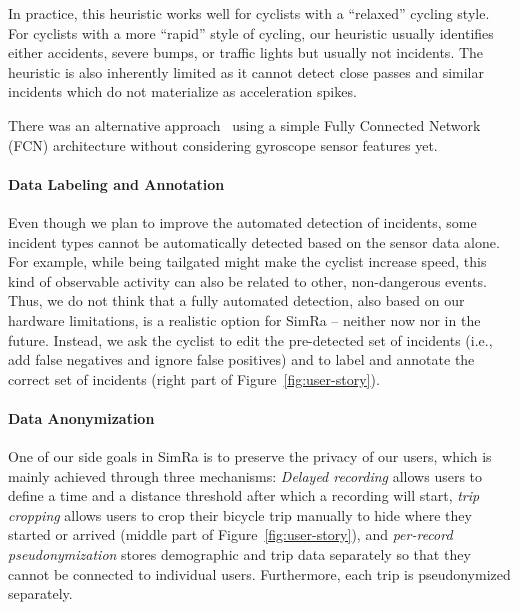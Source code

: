 In practice, this heuristic works well for cyclists with a ``relaxed'' cycling style.
For cyclists with a more ``rapid'' style of cycling, our heuristic usually identifies either accidents, severe bumps, or traffic lights but usually not incidents.
The heuristic is also inherently limited as it cannot detect close passes and similar incidents which do not materialize as acceleration spikes.

There was an alternative approach~\cite{sanchez2020detecting} using a simple Fully Connected Network (FCN) architecture without considering gyroscope sensor features yet.

\paragraph{Data Labeling and Annotation}

Even though we plan to improve the automated detection of incidents, some incident types cannot be automatically detected based on the sensor data alone.
For example, while being tailgated might make the cyclist increase speed, this kind of observable activity can also be related to other, non-dangerous events.
Thus, we do not think that a fully automated detection, also based on our hardware limitations, is a realistic option for SimRa -- neither now nor in the future.
Instead, we ask the cyclist to edit the pre-detected set of incidents (i.e., add false negatives and ignore false positives) and to label and annotate the correct set of incidents (right part of Figure~\ref{fig:user-story}).

\paragraph{Data Anonymization}

One of our side goals in SimRa is to preserve the privacy of our users, which is mainly achieved through three mechanisms: \emph{Delayed recording} allows users to define a time and a distance threshold after which a recording will start, \emph{trip cropping} allows users to crop their bicycle trip manually to hide where they started or arrived (middle part of Figure~\ref{fig:user-story}), and \emph{per-record pseudonymization} stores demographic and trip data separately so that they cannot be connected to individual users.
Furthermore, each trip is pseudonymized separately.

